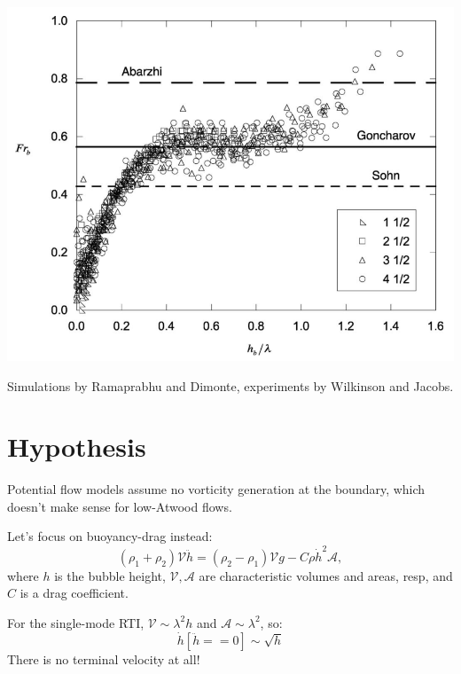 \documentclass[12pt]{beamer}
\begin{document}
\begin{frame}[t]
{\includegraphics[height=0.5\textheight]{graphics/wilkinson_Fr.png}

{\footnotesize Simulations by Ramaprabhu and Dimonte, experiments by Wilkinson and Jacobs.}
}

\end{frame}

\section{Hypothesis}


\begin{frame}
Potential flow models assume no vorticity generation at the boundary,
which doesn't make sense for low-Atwood flows.

\vspace{20pt} \pause
Let's focus on buoyancy-drag instead:
\begin{equation*}
(\rho_1 + \rho_2) \mathcal{V} \ddot{h} = (\rho_2 - \rho_1) \mathcal{V} g - C \rho \dot{h}^2 \mathcal{A},
\end{equation*}
where $h$ is the bubble height, $\mathcal{V}, \mathcal{A}$ are characteristic volumes and areas, resp, and $C$ is a drag coefficient.

\vspace{20pt} \pause
For the single-mode RTI, $\mathcal{V} \sim \lambda^2 h$ and $\mathcal{A} \sim \lambda^2$, so:
\begin{equation*}
\dot{h}\left[\ddot{h} == 0\right] \sim \sqrt{h}
\end{equation*}
There is no terminal velocity at all!

\end{frame}
\end{document}
